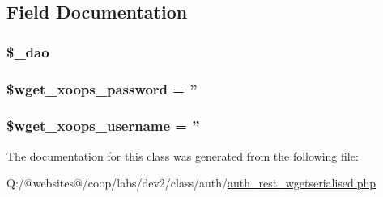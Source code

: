 \subsection{Field Documentation}
\hypertarget{class_xortify_auth_rest___wgetserialised_a12a029c610f699b4b25e79a1f64a3485}{
\subsubsection[{\$\-\_\-dao}]{\setlength{\rightskip}{0pt plus 5cm}\$\-\_\-dao}}\label{class_xortify_auth_rest___wgetserialised_a12a029c610f699b4b25e79a1f64a3485}
\hypertarget{class_xortify_auth_rest___wgetserialised_ab9145a618042e8282ecb90d5f634311f}{
\subsubsection[{\$wget\-\_\-xoops\-\_\-password}]{\setlength{\rightskip}{0pt plus 5cm}\$wget\-\_\-xoops\-\_\-password = ''}}\label{class_xortify_auth_rest___wgetserialised_ab9145a618042e8282ecb90d5f634311f}
\hypertarget{class_xortify_auth_rest___wgetserialised_a237f5dcc3c161c5b1909327a90b56618}{
\subsubsection[{\$wget\-\_\-xoops\-\_\-username}]{\setlength{\rightskip}{0pt plus 5cm}\$wget\-\_\-xoops\-\_\-username = ''}}\label{class_xortify_auth_rest___wgetserialised_a237f5dcc3c161c5b1909327a90b56618}


The documentation for this class was generated from the following file\-:\begin{DoxyCompactItemize}
\item 
Q\-:/@websites@/coop/labs/dev2/class/auth/\hyperlink{auth__rest__wgetserialised_8php}{auth\-\_\-rest\-\_\-wgetserialised.\-php}\end{DoxyCompactItemize}
